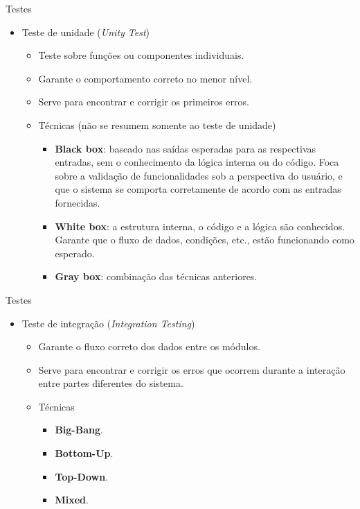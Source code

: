 \documentclass{beamer}
\begin{document}
\begin{frame}{Testes}
	\begin{itemize}
		\justifying
		\item Teste de unidade (\textit{Unity Test})
			\begin{itemize}
				\justifying
				\item Teste sobre funções ou componentes individuais.
				\item Garante o comportamento correto no menor nível.
				\item Serve para encontrar e corrigir os primeiros erros.
				\item Técnicas (não se resumem somente ao teste de unidade)
					\begin{itemize}
						\justifying
						\item \textbf{Black box}: baseado nas saídas esperadas para as respectivas entradas, sem o conhecimento da lógica interna ou do código. Foca sobre a validação de funcionalidades sob a perspectiva do usuário, e que o sistema se comporta corretamente de acordo com as entradas fornecidas.
						\item \textbf{White box}: a estrutura interna, o código e a lógica são conhecidos. Garante que o fluxo de dados, condições, etc., estão funcionando como esperado.
						\item \textbf{Gray box}: combinação das técnicas anteriores.
					\end{itemize}
			\end{itemize}
	\end{itemize}
\end{frame}

\begin{frame}{Testes}
	\begin{itemize}
		\justifying
		\item Teste de integração (\textit{Integration Testing})
			\begin{itemize}
				\item Garante o fluxo correto dos dados entre os módulos.
				\item Serve para encontrar e corrigir os erros que ocorrem durante a interação entre partes diferentes do sistema.
				\item Técnicas
					\begin{itemize}
						\justifying
						\item \textbf{Big-Bang}.
						\item \textbf{Bottom-Up}.
						\item \textbf{Top-Down}.
						\item \textbf{Mixed}.
					\end{itemize}
			\end{itemize}
	\end{itemize}
\end{frame}
\end{document}
